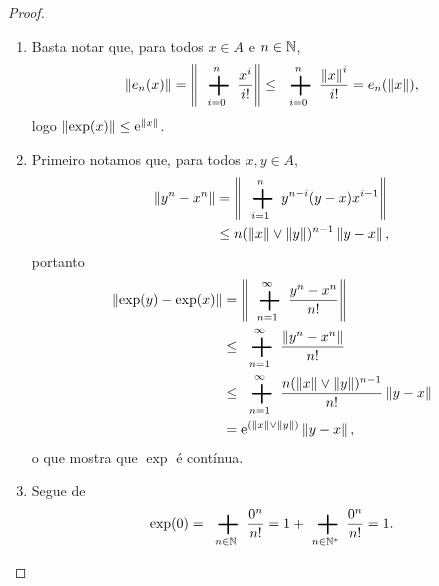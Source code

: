 \begin{proof}
	\begin{enumerate}
	\item Basta notar que, para todos $x \in A$ e $n \in \mathbb{N}$,
		\begin{equation*}
		\nor{e_n(x)} = \nor{\sum_{i=0}^{n} \frac{x^i}{i!}} \leq \sum_{i=0}^{n} \frac{\nor{x}^i}{i!} = e_n(\nor{x}),
		\end{equation*}
logo $\left\Vert{\exp(x)}\right\Vert \leq \mathrm{e}^{\left\Vert{x}\right\Vert}$.

	\item Primeiro notamos que, para todos $x,y \in A$,
		\begin{align*}
		\nor{y^n-x^n} &= \nor{\sum_{i=1}^{n} y^{n-i}(y-x)x^{i-1}} \\
			&\leq n(\nor{x} \opmax \nor{y})^{n-1}\nor{y-x},
		\end{align*}
portanto
	\begin{align*}
	\nor{\exp(y) - \exp(x)} &= \nor{\sum_{n=1}^\infty \frac{y^n-x^n}{n!}} \\
		&\leq \sum_{n=1}^\infty \frac{\nor{y^n-x^n}}{n!} \\
		&\leq \sum_{n=1}^\infty \frac{n(\nor{x} \opmax \nor{y})^{n-1}}{n!} \nor{y-x} \\
		&= \e^{(\nor{x} \opmax \nor{y})}\nor{y-x},
	\end{align*}
o que mostra que $\exp$ é contínua.

	\item Segue de
		\begin{equation*}
		\exp(0) = \sum_{n \in \N} \frac{0^n}{n!} = 1 + \sum_{n \in \N^*} \frac{0^n}{n!} = 1.
		\end{equation*}


\end{enumerate}
\end{proof}
